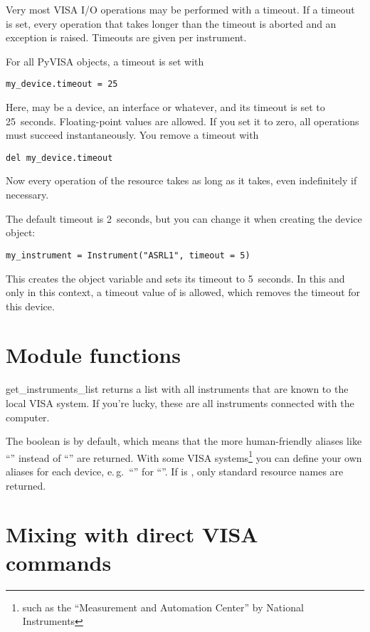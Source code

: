 \documentclass{howto}
\begin{document}
Very most VISA I/O operations may be performed with a timeout.  If a timeout is
set, every operation that takes longer than the timeout is aborted and an
exception is raised.  Timeouts are given per instrument.

For all PyVISA objects, a timeout is set with
\begin{verbatim}
my_device.timeout = 25
\end{verbatim}
Here,  may be a device, an interface or whatever, and its
timeout is set to 25~seconds.  Floating-point values are allowed.  If you set
it to zero, all operations must succeed instantaneously.  You remove a timeout
with
\begin{verbatim}
del my_device.timeout
\end{verbatim}
Now every operation of the resource takes as long as it takes, even
indefinitely if necessary.

The default timeout is 2~seconds, but you can change it when creating the
device object:
\begin{verbatim}
my_instrument = Instrument("ASRL1", timeout = 5)
\end{verbatim}
This creates the object variable  and sets its timeout to
5~seconds.  In this and only in this context, a timeout value of  is
allowed, which removes the timeout for this device.

\section{Module functions}

\begin{funcdesc}{get_instruments_list}{}
  returns a list with all instruments that are known to the local VISA system.
  If you're lucky, these are all instruments connected with the computer.

  The boolean  is  by default, which means that the
  more human-friendly aliases like ``'' instead of ``''
  are returned.  With some VISA systems\footnote{such as the ``Measurement and
    Automation Center'' by National Instruments} you can define your own
  aliases for each device, e.\,g.\ ``'' for
  ``''.  If  is , only
  standard resource names are returned.
\end{funcdesc}


\section{Mixing with direct VISA commands}
\end{document}

